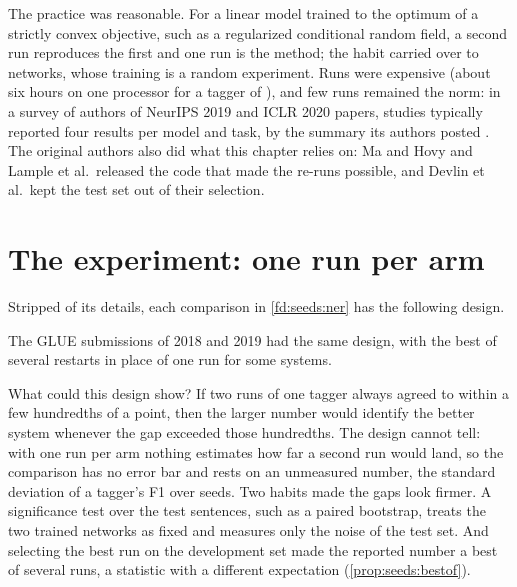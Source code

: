 \begin{refsection}
The practice was reasonable. For a linear model trained to the optimum of a strictly convex objective, such as a regularized conditional random field, a second run reproduces the first and one run is the method; the habit carried over to networks, whose training is a random experiment. Runs were expensive (about six hours on one processor for a tagger of \textcite{ChiuNichols2016}), and few runs remained the norm: in a survey of authors of NeurIPS 2019 and ICLR 2020 papers, studies typically reported four results per model and task, by the summary its authors posted \parencite{BouthillierVaroquaux2020}. The original authors also did what this chapter relies on: Ma and Hovy and Lample et al.\ released the code that made the re-runs possible, and Devlin et al.\ kept the test set out of their selection.

\section{The experiment: one run per arm}\label{sec:seeds:experiment}

Stripped of its details, each comparison in \cref{fd:seeds:ner} has the following design.

\begin{experiment}
\end{experiment}

The GLUE submissions of 2018 and 2019 had the same design, with the best of several restarts in place of one run for some systems.

What could this design show? If two runs of one tagger always agreed to within a few hundredths of a point, then the larger number would identify the better system whenever the gap exceeded those hundredths. The design cannot tell: with one run per arm nothing estimates how far a second run would land, so the comparison has no error bar and rests on an unmeasured number, the standard deviation of a tagger's F1 over seeds. Two habits made the gaps look firmer. A significance test over the test sentences, such as a paired bootstrap, treats the two trained networks as fixed and measures only the noise of the test set. And selecting the best run on the development set made the reported number a best of several runs, a statistic with a different expectation (\cref{prop:seeds:bestof}).


\end{refsection}
